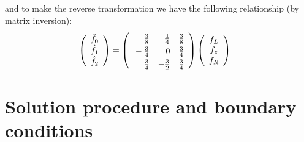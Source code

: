 \documentclass[10pt,a4paper]{article}
\begin{document}
and to make the reverse transformation we have the following relationship (by
matrix inversion):
\begin{align*}
\left( \begin{array}{c}
\hat{f}_0 \\ \hat{f}_1 \\ \hat{f}_2
\end{array} \right)
& = \left( \begin{array}{rrr}
\rule{0pt}{4mm} \frac{3}{8} & \frac{1}{4} & \frac{3}{8} \\
\rule{0pt}{4mm} -\frac{3}{4} & 0 & \frac{3}{4} \\
\rule{0pt}{4mm} \frac{3}{4} & -\frac{3}{2} & \frac{3}{4}
\end{array} \right)
\left( \begin{array}{c}
f_L \\ f_z \\ f_R
\end{array} \right)
\end{align*}

\section{Solution procedure and boundary conditions}
\label{sec:solution}
\end{document}

